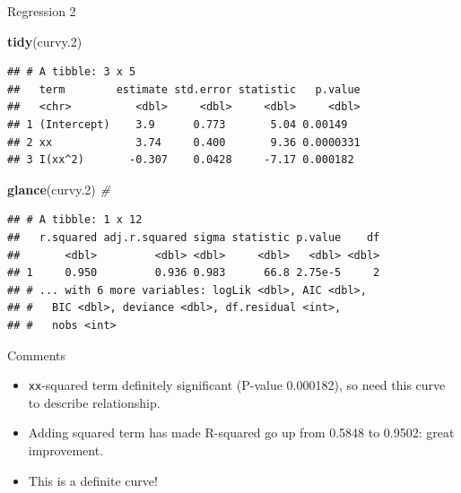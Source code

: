 \documentclass[
  ignorenonframetext,
]{beamer}
\newenvironment{Shaded}{\begin{snugshade}}{\end{snugshade}}
\newcommand{\CommentTok}[1]{\textcolor[rgb]{0.56,0.35,0.01}{\textit{#1}}}
\newcommand{\FloatTok}[1]{\textcolor[rgb]{0.00,0.00,0.81}{#1}}
\newcommand{\KeywordTok}[1]{\textcolor[rgb]{0.13,0.29,0.53}{\textbf{#1}}}
\newcommand{\NormalTok}[1]{#1}
\begin{document}
\begin{frame}[fragile]{Regression 2}
\protect\hypertarget{regression-2}{}

\begin{Shaded}
\begin{Highlighting}[]
\KeywordTok{tidy}\NormalTok{(curvy}\FloatTok{.2}\NormalTok{)}
\end{Highlighting}
\end{Shaded}

\begin{verbatim}
## # A tibble: 3 x 5
##   term        estimate std.error statistic   p.value
##   <chr>          <dbl>     <dbl>     <dbl>     <dbl>
## 1 (Intercept)    3.9      0.773       5.04 0.00149  
## 2 xx             3.74     0.400       9.36 0.0000331
## 3 I(xx^2)       -0.307    0.0428     -7.17 0.000182
\end{verbatim}

\begin{Shaded}
\begin{Highlighting}[]
\KeywordTok{glance}\NormalTok{(curvy}\FloatTok{.2}\NormalTok{) }\CommentTok{#}
\end{Highlighting}
\end{Shaded}

\begin{verbatim}
## # A tibble: 1 x 12
##   r.squared adj.r.squared sigma statistic p.value    df
##       <dbl>         <dbl> <dbl>     <dbl>   <dbl> <dbl>
## 1     0.950         0.936 0.983      66.8 2.75e-5     2
## # ... with 6 more variables: logLik <dbl>, AIC <dbl>,
## #   BIC <dbl>, deviance <dbl>, df.residual <int>,
## #   nobs <int>
\end{verbatim}

\end{frame}

\begin{frame}[fragile]{Comments}
\protect\hypertarget{comments-2}{}

\begin{itemize}
\item
  \texttt{xx}-squared term definitely significant (P-value 0.000182), so
  need this curve to describe relationship.
\item
  Adding squared term has made R-squared go up from 0.5848 to 0.9502:
  great improvement.
\item
  This is a definite curve!
\end{itemize}

\end{frame}
\end{document}
